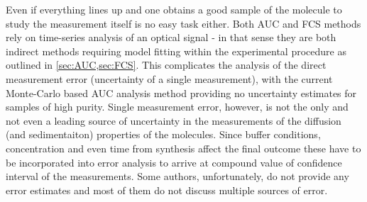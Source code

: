 \documentclass{doctoral}
\begin{document}
Even if everything lines up and one obtains a good sample of the molecule to study the measurement itself is no easy task either.
Both AUC and FCS methods rely on time-series analysis of an optical signal - in that sense they are both indirect methods requiring model fitting within the experimental procedure as outlined in \ref{sec:AUC,sec:FCS}.
This complicates the analysis of the direct measurement error (uncertainty of a single measurement), with the current Monte-Carlo based AUC analysis method providing no uncertainty estimates for samples of high purity.
Single measurement error, however, is not the only and not even a leading source of uncertainty in the measurements of the diffusion (and sedimentaiton) properties of the molecules.
Since buffer conditions, concentration and even time from synthesis\cite{Nag_2011} affect the final outcome these have to be incorporated into error analysis to arrive at compound value of confidence interval of the measurements.
Some authors, unfortunately, do not provide any error estimates\cite{Poznar_2017,Khaymina_2007} and most of them do not discuss multiple sources of error.
\end{document}
